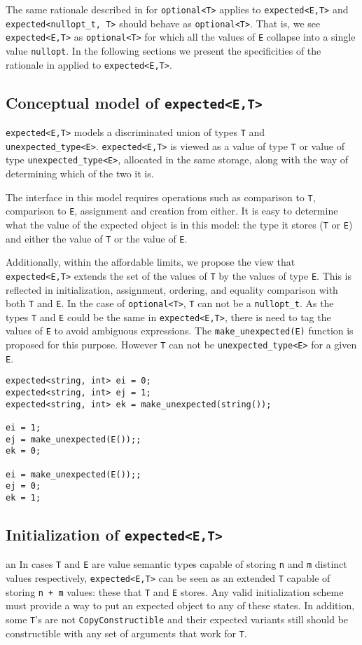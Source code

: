 \documentclass[a4paper,10pt]{article}
\newcommand{\cpp}[1]{\lstinline{#1}}
\begin{document}
The same rationale described in \cite{OptionalRev4} for \cpp{optional<T>} applies to \cpp{expected<E,T>} and \cpp{expected<nullopt_t, T>} should behave as \cpp{optional<T>}.  That is, we see \cpp{expected<E,T>} as \cpp{optional<T>} for which all the values of \cpp{E} collapse into a single value \cpp{nullopt}. In the following sections we present the specificities of the rationale in \cite{OptionalRev4} applied to  \cpp{expected<E,T>}.

\subsection{Conceptual model of \cpp{expected<E,T>}}

\cpp{expected<E,T>} models a discriminated union of types \cpp{T} and \cpp{unexpected_type<E>}. \cpp{expected<E,T>} is viewed as a value of type \cpp{T} or value of type \cpp{unexpected_type<E>}, allocated in the same storage, along with the way of determining which of the two it is. 

The interface in this model requires operations such as comparison to \cpp{T}, comparison to \cpp{E}, assignment and creation from either. It is easy to determine what the value of the expected object is in this model: the type it stores (\cpp{T} or \cpp{E}) and either the value of \cpp{T} or the value of \cpp{E}. 

Additionally, within the affordable limits, we propose the view that \cpp{expected<E,T>} extends the set of the values of \cpp{T} by the values of type \cpp{E}. This is reflected in initialization, assignment, ordering, and equality comparison with both \cpp{T} and \cpp{E}. In the case of  \cpp{optional<T>}, \cpp{T} can not be a \cpp{nullopt_t}. As the types \cpp{T} and \cpp{E} could be the same in \cpp{expected<E,T>}, there is need to tag the values of \cpp{E} to avoid ambiguous expressions. The \cpp{make_unexpected(E)} function is proposed for this purpose. However \cpp{T} can not be  \cpp{unexpected_type<E>} for a given \cpp{E}.

\begin{lstlisting}
expected<string, int> ei = 0;
expected<string, int> ej = 1;
expected<string, int> ek = make_unexpected(string());

ei = 1;
ej = make_unexpected(E());;
ek = 0;

ei = make_unexpected(E());;
ej = 0;
ek = 1;
\end{lstlisting}

\subsection{Initialization of \cpp{expected<E,T>}}
an
In cases \cpp{T} and \cpp{E} are value semantic types capable of storing \cpp{n} and \cpp{m} distinct values respectively, \cpp{expected<E,T>} can be seen as an extended \cpp{T} capable of storing \cpp{n + m} values: these that \cpp{T} and \cpp{E} stores. Any valid initialization scheme must provide a way to put an expected object to any of these states. In addition, some \cpp{T}'s  are not \cpp{CopyConstructible} and their expected variants still should be constructible with any set of arguments that work for \cpp{T}.
\end{document}
